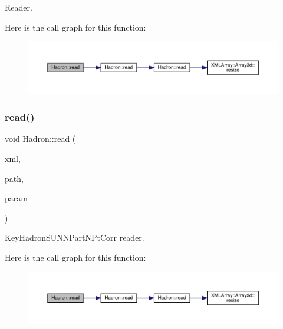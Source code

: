 Reader. 

Here is the call graph for this function\+:
\nopagebreak
\begin{figure}[H]
\begin{center}
\leavevmode
\includegraphics[width=350pt]{d1/daf/namespaceHadron_aa4df93329eeddeec176cd9df5abe9ce1_cgraph}
\end{center}
\end{figure}
\mbox{\label{namespaceHadron_a921e2dea91400934dabd596c18164033}} 
\subsubsection{\texorpdfstring{read()}{read()}\hspace{0.1cm}{\footnotesize\ttfamily [16/94]}}
{\footnotesize\ttfamily void Hadron\+::read (\begin{DoxyParamCaption}\item[{\mbox{\hyperlink{classADATXML_1_1XMLReader}{X\+M\+L\+Reader}} \&}]{xml,  }\item[{const std\+::string \&}]{path,  }\item[{\mbox{\hyperlink{structHadron_1_1KeyHadronSUNNPartNPtCorr__t}{Key\+Hadron\+S\+U\+N\+N\+Part\+N\+Pt\+Corr\+\_\+t}} \&}]{param }\end{DoxyParamCaption})}



Key\+Hadron\+S\+U\+N\+N\+Part\+N\+Pt\+Corr reader. 

Here is the call graph for this function\+:
\nopagebreak
\begin{figure}[H]
\begin{center}
\leavevmode
\includegraphics[width=350pt]{d1/daf/namespaceHadron_a921e2dea91400934dabd596c18164033_cgraph}
\end{center}
\end{figure}
\mbox{\label{namespaceHadron_aa490647cc42691054f51d9885e6ec91c}} 
